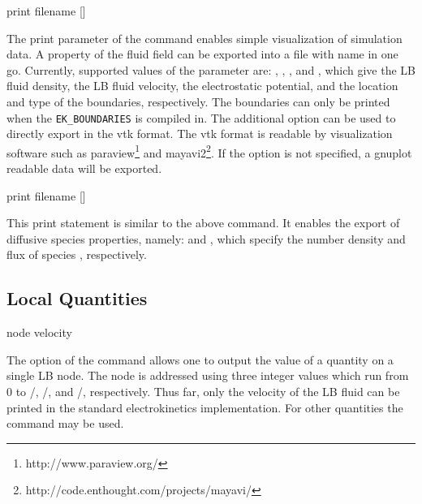 \begin{essyntax}
  print 
  filename []
  \begin{features}
  \end{features}
\end{essyntax}
The print parameter of the  command enables simple 
visualization of simulation data. A property of the fluid field can be exported
into a file with name  in one go. Currently, supported values of
the parameter  are: , , 
, and , which give the LB fluid density, the LB 
fluid velocity, the electrostatic potential, and the location and type of the
boundaries, respectively. The boundaries can only be printed when the 
\texttt{EK_BOUNDARIES} is compiled in. The additional option  can be
used to directly export in the vtk format. The vtk format is readable
by visualization software such as paraview\footnote{http://www.paraview.org/}
and mayavi2\footnote{http://code.enthought.com/projects/mayavi/}. If the 
 option is not specified, a gnuplot readable data will be exported.

\begin{essyntax}
  print 
  filename []
  \begin{features}
  \end{features}
\end{essyntax}
This print statement is similar to the above command. It enables the export of
diffusive species properties, namely:  and , which 
specify the number density and flux of species ,
respectively.

\subsection{\label{ssec:ek-local-quantities}Local Quantities}

\begin{essyntax}
  node    
  velocity
  \begin{features}
  \end{features}
\end{essyntax}
The  option of the  command allows one to output 
the value of a quantity on a single LB node. The node is addressed using three
integer values which run from 0 to /,
/, and /, respectively. Thus far,
only the velocity of the LB fluid can be printed in the standard electrokinetics
implementation. For other quantities the  command may be used. 


